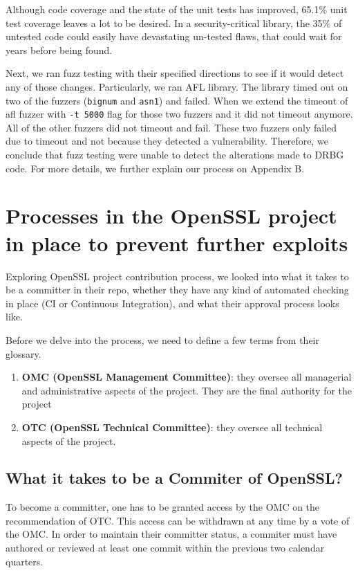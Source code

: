 \documentclass[conference]{IEEEtran}
\begin{document}
Although code coverage and the state of the unit tests has improved,
65.1\% unit test coverage leaves a lot to be desired. In a
security-critical library, the 35\% of untested code could easily have
devastating un-tested flaws, that could wait for years before being
found.

  Next, we ran fuzz testing with their specified directions to see if
it would detect any of those changes. Particularly, we ran AFL 
library. The library timed out on two
of the fuzzers (\verb|bignum| and \verb|asn1|) and failed. When
we extend the timeout of afl fuzzer with \verb|-t 5000| flag for
those two fuzzers and it did
not timeout anymore. All of the other
fuzzers did not timeout and fail. These two fuzzers only failed due to timeout and not because they
detected a vulnerability. Therefore, we conclude that fuzz testing were unable to detect
the alterations made to DRBG code. For more details, we further explain
our process on Appendix B.

\section{Processes in the OpenSSL project in place to prevent further exploits}

Exploring OpenSSL project contribution process, we looked into what it
takes to be a committer in their repo, whether they have any kind of
automated checking in place (CI or Continuous Integration), and what
their approval process looks like.

Before we delve into the process, we need to define a few terms from
their glossary.

\begin{enumerate}
\item \textbf{OMC (OpenSSL Management Committee)}: they oversee all
  managerial and administrative aspects of the project. They are the
  final authority for the project\cite{6}

\item \textbf{OTC (OpenSSL Technical Committee)}: they oversee all
  technical aspects of the project\cite{6}.

\end{enumerate}

\subsection{What it takes to be a Commiter of OpenSSL?}

To become a committer, one has to be granted access by the OMC on the
recommendation of OTC\cite{7}. This access can be withdrawn at any
time by a vote of the OMC\cite{8}. In order to maintain their
committer status, a commiter must have authored or reviewed at least
one commit within the previous two calendar quarters\cite{8}.
\end{document}
